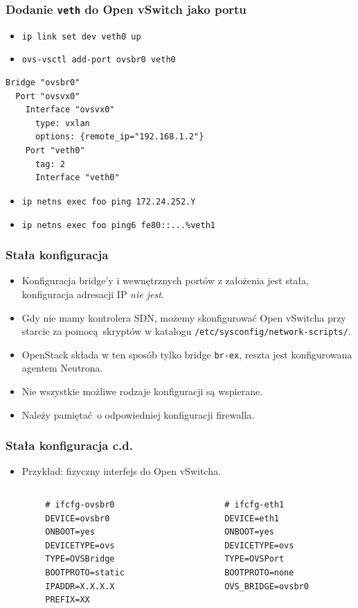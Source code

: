 \documentclass[dvipsnames,table]{beamer}
\begin{document}
\begin{frame}[fragile]
\frametitle{Dodanie {\tt veth} do Open vSwitch jako portu}
\begin{itemize}
	\item {\tt ip link set dev veth0 up}
	\item {\tt ovs-vsctl add-port ovsbr0 veth0}
\end{itemize}
\scriptsize
\begin{verbatim}
Bridge "ovsbr0"
  Port "ovsvx0"
    Interface "ovsvx0"
      type: vxlan
      options: {remote_ip="192.168.1.2"}
    Port "veth0"
      tag: 2
      Interface "veth0"
\end{verbatim}
\normalsize
\begin{itemize}
	\item {\tt ip netns exec foo ping 172.24.252.Y}
	\item {\tt ip netns exec foo ping6 fe80::...\%veth1}
\end{itemize}
\end{frame}

\begin{frame}
\frametitle{Stała konfiguracja}
\begin{itemize}
	\item Konfiguracja bridge'y i wewnętrznych portów z założenia jest stała, konfiguracja adresacji IP {\em nie jest}.
	\item Gdy nie mamy kontrolera SDN, możemy skonfigurować Open vSwitcha przy starcie za pomocą skryptów w katalogu {\tt /etc/sysconfig/network-scripts/}.
	\item OpenStack składa w ten sposób tylko bridge {\tt br-ex}, reszta jest konfigurowana agentem Neutrona. 
	\item Nie wszystkie możliwe rodzaje konfiguracji są wspierane.
	\item Należy pamiętać o odpowiedniej konfiguracji firewalla.
\end{itemize}
\end{frame}

\begin{frame}[fragile]
\frametitle{Stała konfiguracja c.d.}
\begin{itemize}
	\item Przykład: fizyczny interfejs do Open vSwitcha.
\end{itemize}
\begin{columns}
	\begin{column}{0.5\textwidth}
		\begin{verbatim}
		# ifcfg-ovsbr0
		DEVICE=ovsbr0
		ONBOOT=yes
		DEVICETYPE=ovs
		TYPE=OVSBridge
		BOOTPROTO=static
		IPADDR=X.X.X.X
		PREFIX=XX
		\end{verbatim}
	\end{column}
	\begin{column}{0.5\textwidth}
		\begin{verbatim}
		# ifcfg-eth1
		DEVICE=eth1
		ONBOOT=yes
		DEVICETYPE=ovs
		TYPE=OVSPort
		BOOTPROTO=none
		OVS_BRIDGE=ovsbr0
		\end{verbatim}
	\end{column}
\end{columns}
\end{frame}
\end{document}
